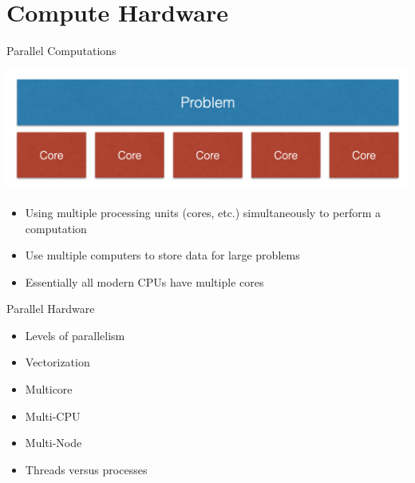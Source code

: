 \section{Compute Hardware}

\begin{frame}{Parallel Computations}
\begin{center}
\includegraphics[width=0.65\linewidth]{figures/problem_over_cores.png}
\end{center}
\begin{itemize}
\item Using multiple processing units (cores, etc.) simultaneously to perform a computation
\item Use multiple computers to store data for large problems
\item Essentially all modern CPUs have multiple cores
\end{itemize}
\end{frame}

\begin{frame}{Parallel Hardware}
\begin{itemize}
\item Levels of parallelism
\item Vectorization
\item Multicore
\item Multi-CPU
\item Multi-Node
\item Threads versus processes
\end{itemize}
\end{frame}

